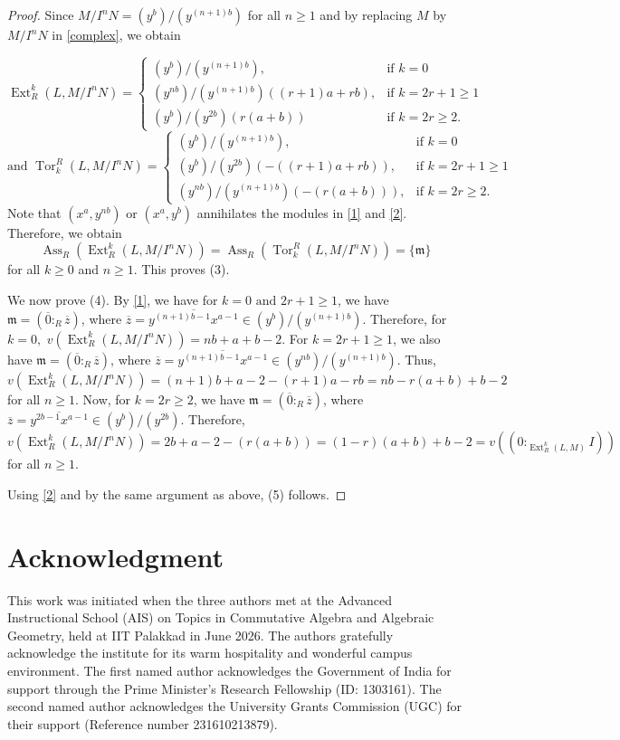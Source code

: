 \documentclass[11pt,reqno]{amsart}
\theoremstyle{definition}
\newcommand{\m}{\mathfrak{m}}
\newcommand{\Ass}{\operatorname{Ass}}
\newcommand{\Ext}{\operatorname{Ext}}
\newcommand{\Tor}{\operatorname{Tor}}
\begin{document}
\begin{proof}
Since $M/I^nN= (y^b)/(y^{(n+1)b})$ for all $n\geq 1$ and by replacing $M$ by $M/I^nN$ in \eqref{complex}, we obtain

\begin{equation}\label{1}
    \Ext^k_R(L,M/I^nN)=\begin{cases}
            (y^b)/(y^{(n+1)b}), & \text{if } k=0 \\ (y^{nb})/(y^{(n+1)b})((r+1)a+rb), & \text{if } k=2r+1\geq 1\\ (y^b)/(y^{2b})(r(a+b))  & \text{if } k=2r\geq 2.
         \end{cases}
\end{equation} 
\begin{equation}\label{2}
   \text{and }  \Tor_k^R(L,M/I^nN)=\begin{cases}
              (y^b)/(y^{(n+1)b}), & \text{if } k=0 \\ (y^b)/(y^{2b})(-((r+1)a+rb)), & \text{if } k=2r+1\geq 1 \\ (y^{nb})/(y^{(n+1)b})(-(r(a+b))),  & \text{if } k=2r\geq 2.
         \end{cases}
\end{equation}
 Note that $(x^a,y^{nb})$ or $(x^a,y^b)$ annihilates the modules in \eqref{1} and \eqref{2}. Therefore, we obtain  $$\Ass_R\left(\Ext^k_R(L,M/I^nN)\right)=\Ass_R\left(\Tor_k^R(L,M/I^nN)\right)=\{\m\}$$ for all $k\geq 0$ and $n\geq 1$. This proves (3).

We now prove (4). By \eqref{1}, we have for $k=0 \text{ and }2r+1\geq 1$, we have $\m=(\overline{0}:_R \overline{z})$, where $\overline{z}=\overline{y^{(n+1)b-1}x^{a-1}}\in (y^b)/(y^{(n+1)b})$. Therefore, for $k=0,$ $v\left(\Ext^k_R(L,M/I^nN)\right)=nb+a+b-2$. For $k=2r+1\geq 1$, we also have $\m=(\overline{0}:_R \overline{z})$, where $\overline{z}=\overline{y^{(n+1)b-1}x^{a-1}}\in (y^{nb})/(y^{(n+1)b})$. Thus, $v(\Ext^k_R(L,M/I^nN))=(n+1)b+a-2-(r+1)a-rb=nb-r(a+b)+b-2$ for all $n\geq 1.$ Now, for $k=2r\geq 2$, we have $\m=(\overline{0}:_R\overline{z})$, where $\overline{z}=\overline{y^{2b-1}x^{a-1}}\in (y^{b})/(y^{2b})$. Therefore, $v( \Ext^k_R(L,M/I^nN))=2b+a-2-(r(a+b))=(1-r)(a+b)+b-2=v((0:_{\Ext^k_R(L,M)}I))$ for all $n\geq 1.$

Using \eqref{2} and by the same argument as above, (5) follows.
\end{proof} 
\noindent
\section*{Acknowledgment}
 This work was initiated when the three authors met at the Advanced Instructional School (AIS) on Topics in Commutative Algebra and Algebraic Geometry, held at IIT Palakkad in June 2026. The authors gratefully acknowledge the institute for its warm hospitality and wonderful campus environment. The first named author acknowledges the Government of India for support through the Prime  Minister's Research Fellowship (ID: 1303161). The second named author acknowledges the University Grants Commission (UGC) for their support (Reference number 231610213879).
\end{document}
